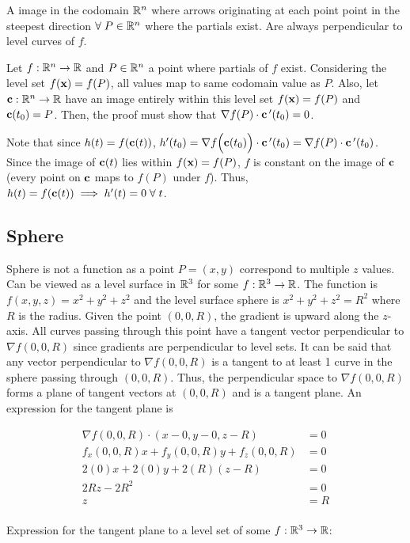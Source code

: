 A image in the codomain $\mathbb{R}^n$ where arrows originating at each point point in the steepest direction $\forall\; P\in \mathbb{R}^n$ where the partials exist.
Are always perpendicular to level curves of $f$.

Let $f:\mathbb{R}^n\to \mathbb{R}$ and $P\in \mathbb{R}^n$ a point where partials of $f$ exist. Considering the level set $f(\textbf{x})=f(P)$,
all values map to same codomain value as $P$. Also, let $\textbf{c}:\mathbb{R}^n\to \mathbb{R}$ have an image entirely within this level set $f(\textbf{x})=f(P)$
and $\textbf{c}(t_0)=P$. Then, the proof must show that $\nabla f(P)\cdot \textbf c\,'(t_0)=0$.

Note that since $h(t)=f(\textbf{c}(t))$, $h'(t_0)=\nabla f \Big(\textbf c (t_0) \Big)\cdot \textbf c\,'(t_0)=\nabla f (P)\cdot  \textbf c\,'(t_0)$.
Since the image of $\textbf{c}(t)$ lies within $f(\textbf{x})=f(P)$, $f$ is constant on the image of $\textbf{c}$ (every point on $\textbf{c}$ maps to $f(P)$ under $f$).
Thus, $h(t)=f(\textbf{c}(t))\implies h'(t)=0\;\forall\;t$.

\subsection{Sphere}

Sphere is not a function as a point $P=(x,y)$ correspond to multiple $z$ values.
Can be viewed as a level surface in $\mathbb{R}^3$ for some $f:\mathbb{R}^3\to \mathbb{R}$. The function is $f(x,y,z)=x^2+y^2+z^2$
and the level surface sphere is $x^2+y^2+z^2=R^2$ where $R$ is the radius.
Given the point $(0,0,R)$, the gradient is upward along the $z$-axis. All curves passing through this point
have a tangent vector perpendicular to $\nabla f(0,0,R)$ since gradients are perpendicular to level sets.
It can be said that any vector perpendicular to $\nabla f(0,0,R)$ is a tangent to at least 1 curve in the sphere passing through $(0,0,R)$.
Thus, the perpendicular space to $\nabla f(0,0,R)$ forms a plane of tangent vectors at $(0,0,R)$ and is a tangent plane.
An expression for the tangent plane is 

\begin{align*}
    \nabla f (0,0,R)\cdot(x-0, y-0, z-R)&=0\\
    f_x(0,0,R)x+f_y(0,0,R)y+f_z(0,0,R)&=0\\
    2(0)x+2(0)y+2(R)(z-R)&=0\\
    2Rz-2R^2&=0\\
    z&=R\\
\end{align*}

Expression for the tangent plane to a level set of some $f:\mathbb{R}^3\to \mathbb{R}$:

